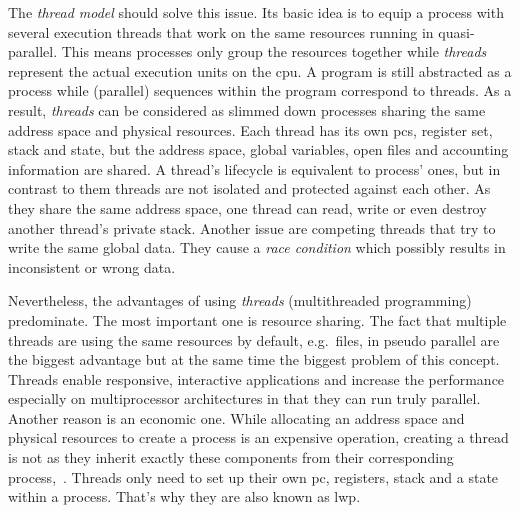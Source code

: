The \textit{thread model} should solve this issue.
Its basic idea is to equip a process with several execution threads that work on the same resources running in quasi-parallel\cite{tanenbaum-modern-operating-systems}.
This means processes only group the resources together while \textit{threads} represent the actual execution units on the \ac{cpu}\cite{tanenbaum-modern-operating-systems}.
A program is still abstracted as a process while (parallel) sequences within the program correspond to threads.
As a result, \textit{threads} can be considered as slimmed down processes sharing the same address space and physical resources.
Each thread has its own \acp{pc}, register set, stack and state, but the address space, global variables, open files and accounting information are shared\cite{tanenbaum-modern-operating-systems}.
A thread's lifecycle is equivalent to process' ones, but in contrast to them threads are not isolated and protected against each other\cite{glatz2015betriebssysteme}.
As they share the same address space, one thread can read, write or even destroy another thread's private stack\cite{tanenbaum-modern-operating-systems}.
Another issue are competing threads that try to write the same global data.
They cause a \textit{race condition} which possibly results in inconsistent or wrong data\cite{brause2017betriebssysteme}.

Nevertheless, the advantages of using \textit{threads} (multithreaded programming) predominate.
The most important one is resource sharing. 
The fact that multiple threads are using the same resources by default, e.g.\ files, in pseudo parallel are the biggest advantage but at the same time the biggest problem of this concept.
Threads enable responsive, interactive applications and increase the performance especially on multiprocessor architectures in that they can run truly parallel\cite{silberschatz2009operating}.
Another reason is an economic one.
While allocating an address space and physical resources to create a process is an expensive operation, creating a thread is not as they inherit exactly these components from their corresponding process\cite{silberschatz2009operating},~\cite{mandl2014Grundkurs}.
Threads only need to set up their own \ac{pc}, registers, stack and a state within a process. 
That's why they are also known as \acf{lwp}\cite{mandl2014Grundkurs}.

